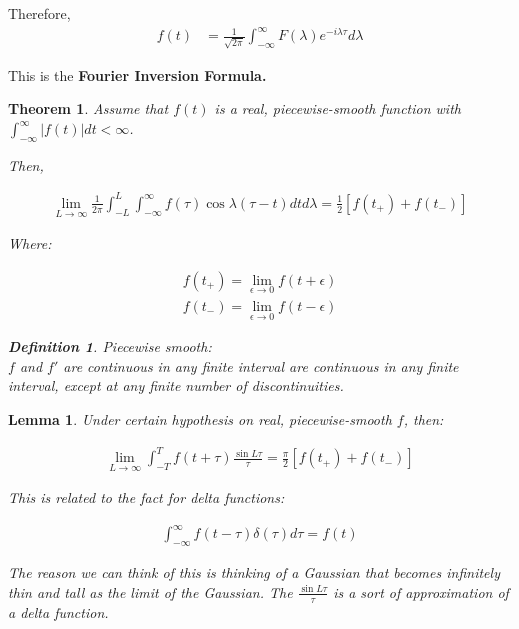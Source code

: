 \documentclass{article}
\newtheorem{theorem}{Theorem}[section]
\newtheorem{lemma}{Lemma}
\theoremstyle{definition}
\newtheorem{definition}{Definition}[section]
\newcommand{\Def}[2]{
\begin{shaded*}
\begin{definition}{\textit{#1}}\\#2\end{definition}
\end{shaded*}
}
\begin{document}
Therefore,
\begin{align*}
f(t) &= \frac{1}{\sqrt{2\pi}} \int_{-\infty}^\infty F(\lambda) e^{-i\lambda \tau} d\lambda 
\end{align*}

This is the \textbf{Fourier Inversion Formula.}

\begin{theorem}
Assume that $f(t)$ is a real, piecewise-smooth function with $\int_{-\infty}^{\infty} |f(t)| dt < \infty $. 

Then, 

\begin{align*}
\lim_{L \to \infty } \frac{1}{2 \pi } \int_{-L}^{L} \int_{-\infty}^{\infty} f(\tau) \cos \lambda (\tau - t) dt d\lambda = \frac{1}{2} \left[f(t_+) + f(t_-)\right]
\end{align*}

Where:

\begin{align*}
f(t_+) = \lim_{\epsilon \to 0} f(t + \epsilon) \\ 
f(t_-) = \lim_{\epsilon \to 0} f(t - \epsilon)
\end{align*}



\Def{Piecewise smooth:} {$f$ and $f'$ are continuous in any finite interval are continuous in any finite interval, except at any finite number of discontinuities.}

\end{theorem}

\begin{lemma}
Under certain hypothesis on real, piecewise-smooth $f$, then:

\begin{align*}
\lim_{L \to  \infty} \int_{-T}^{T} f(t + \tau) \frac{\sin L\tau}{\tau} 
= \frac{\pi}{2} \left[f(t_+) + f(t_-)\right]
\end{align*}

This is related to the fact for delta functions:


\begin{align*}
\int_{-\infty}^{\infty} f(t - \tau) \delta(\tau) d\tau = f(t)
\end{align*}

The reason we can think of this is thinking of a Gaussian that becomes infinitely thin and tall as the limit of the Gaussian. The $\frac{\sin L\tau}{\tau} $ is a sort of approximation of a delta function.
\end{lemma}
\end{document}

